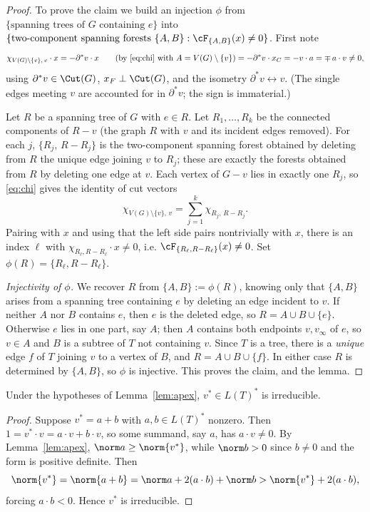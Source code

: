 \begin{proof}
To prove the claim we build an injection $\phi$ from
$\{\text{spanning trees of }G\text{ containing }e\}$ into
$\{\text{two-component spanning forests }\{A,B\}:\cF_{\{A,B\}}(x)\ne0\}$.
First note
\[
\chi_{V(G)\setminus\{v\},\,v}\cdot x
=-\partial^\ast v\cdot x \qquad(\text{by }\eqref{eq:chi}\text{ with }A=V(G)\setminus\{v\})
=-\partial^\ast v\cdot x_C=-v\cdot a=\mp\,a\cdot v\ne0,
\]
using $\partial^\ast v\in\Cut(G)$, $x_F\perp\Cut(G)$, and the isometry
$\partial^\ast v\leftrightarrow v$.  (The single edges meeting $v$ are accounted for in
$\partial^\ast v$; the sign is immaterial.)

Let $R$ be a spanning tree of $G$ with $e\in R$.  Let $R_1,\dots,R_k$ be the connected
components of $R-v$ (the graph $R$ with $v$ and its incident edges removed).  For each $j$,
$\{R_j,\,R-R_j\}$ is the two-component spanning forest obtained by deleting from $R$ the
unique edge joining $v$ to $R_j$; these are exactly the forests obtained from $R$ by deleting
one edge at $v$.  Each vertex of $G-v$ lies in exactly one $R_j$, so \eqref{eq:chi} gives the
identity of cut vectors
\[
\chi_{V(G)\setminus\{v\},\,v}=\sum_{j=1}^k\chi_{R_j,\,R-R_j}.
\]
Pairing with $x$ and using that the left side pairs nontrivially with $x$, there is an index
$\ell$ with $\chi_{R_\ell,R-R_\ell}\cdot x\ne0$, i.e.
$\cF_{\{R_\ell,R-R_\ell\}}(x)\ne0$.  Set $\phi(R)=\{R_\ell,R-R_\ell\}$.

\emph{Injectivity of $\phi$.}  We recover $R$ from $\{A,B\}:=\phi(R)$, knowing only that
$\{A,B\}$ arises from a spanning tree containing $e$ by deleting an edge incident to $v$.  If
neither $A$ nor $B$ contains $e$, then $e$ is the deleted edge, so $R=A\cup B\cup\{e\}$.
Otherwise $e$ lies in one part, say $A$; then $A$ contains both endpoints $v,v_\infty$ of
$e$, so $v\in A$ and $B$ is a subtree of $T$ not containing $v$.  Since $T$ is a tree, there
is a \emph{unique} edge $f$ of $T$ joining $v$ to a vertex of $B$, and $R=A\cup B\cup\{f\}$.
In either case $R$ is determined by $\{A,B\}$, so $\phi$ is injective.  This proves the claim,
and the lemma.
\end{proof}

\begin{cor}
\label{cor:apex}
Under the hypotheses of Lemma~\ref{lem:apex}, $v^\ast\in L(T)^\ast$ is irreducible.
\end{cor}

\begin{proof}
Suppose $v^\ast=a+b$ with $a,b\in L(T)^\ast$ nonzero.  Then
$1=v^\ast\cdot v=a\cdot v+b\cdot v$, so some summand, say $a$, has $a\cdot v\ne0$.  By
Lemma~\ref{lem:apex}, $\norm a\ge\norm{v^\ast}$, while $\norm b>0$ since $b\ne0$ and the form
is positive definite.  Then
\[
\norm{v^\ast}=\norm{a+b}=\norm a+2(a\cdot b)+\norm b>\norm{v^\ast}+2(a\cdot b),
\]
forcing $a\cdot b<0$.  Hence $v^\ast$ is irreducible.
\end{proof}

